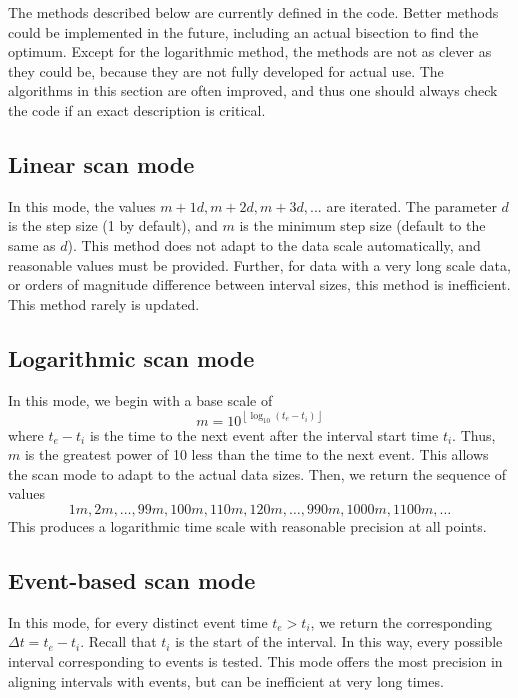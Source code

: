 \documentclass[draft]{article}
\begin{document}
The methods described below are currently defined in the code.  Better
methods could be implemented in the future, including an actual
bisection to find the optimum.  Except for the logarithmic method, the
methods are not as clever as they could be, because they are not fully
developed for actual use.  The algorithms in this section are often
improved, and thus one should always check the code if an exact
description is critical.

\subsection{Linear scan mode}
In this mode, the values $m+1d, m+2d, m+3d, ...$ are iterated.  The
parameter $d$ is the step size (1 by default), and $m$ is the minimum
step size (default to the same as $d$).  This method does not adapt to
the data scale automatically, and reasonable values must be provided.
Further, for data with a very long scale data, or orders of magnitude
difference between interval sizes, this method is inefficient.  This
method rarely is updated.

\subsection{Logarithmic scan mode}
In this mode, we begin with a base scale of
\begin{equation}
  m = 10^{\left\lfloor \log_{10}(t_e-t_i)  \right\rfloor}
\end{equation}
where $t_e-t_i$ is the time to the next event after the interval start
time $t_i$.
Thus, $m$ is the greatest power of 10 less than the time to the next
event.  This allows the scan mode to adapt to the actual data sizes.
Then, we return the sequence of values
\begin{equation}
  1m, 2m, \ldots, 99m, 100m, 110m, 120m, \ldots, 990m, 1000m,
  1100m, \ldots
\end{equation}
This produces a logarithmic time scale with reasonable precision at
all points.

\subsection{Event-based scan mode}
In this mode, for every distinct event time $t_e > t_i$, we return the
corresponding $\Delta t = t_e-t_i$.  Recall that $t_i$ is the start of
the interval.  In this way, every possible interval corresponding to
events is tested.  This mode offers the most precision in aligning
intervals with events, but can be inefficient at very long times.
\end{document}
